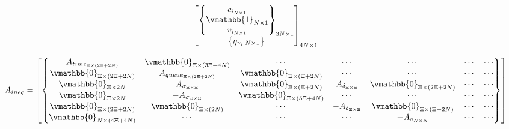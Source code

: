 \documentclass[letterpaper, 10pt, conference]{IEEEtran}
\begin{document}
\begin{equation}
\begin{array}{c}
\begin{bmatrix}
\begin{Bmatrix}
        c_{i_{N \times 1}} \\
        \vmathbb{1}_{N \times 1} \\
        v_{i_{N \times 1}} \\
    \end{Bmatrix}_{3N \times 1} \\
    \begin{Bmatrix}
        \eta_{\gamma_{i}\; N \times 1} \\
    \end{Bmatrix}
\end{bmatrix}_{4N \times 1}
\end{array}
\end{equation}

\begin{equation}
\begin{array}{c}
    A_{ineq} =
    \begin{bmatrix}
        \begin{Bmatrix}
            A_{time_{\Xi \times (2\Xi + 2N)}}   & \vmathbb{0}_{\Xi \times (3\Xi + 4N)} & \cdots                              & \cdots                       & \cdots                            & \cdots              & \cdots \\
            \vmathbb{0}_{\Xi \times (2\Xi + 2N)} & A_{queue_{\Xi \times (2\Xi + 2N)}}  & \vmathbb{0}_{\Xi \times (\Xi + 2N)}  & \cdots                       & \cdots                            & \cdots              & \cdots \\
            \vmathbb{0}_{\Xi \times 2N}          & A_{\sigma_{\Xi \times \Xi}}         & \vmathbb{0}_{\Xi \times (\Xi + 2N)}  & A_{\delta_{\Xi \times \Xi}}  & \vmathbb{0}_{\Xi \times (2\Xi + 2N)} & \cdots              & \cdots \\
            \vmathbb{0}_{\Xi \times 2N}          & -A_{\sigma_{\Xi \times \Xi}}        & \vmathbb{0}_{\Xi \times (5\Xi + 4N)} & \cdots                       & \cdots                            & \cdots              & \cdots \\
            \vmathbb{0}_{\Xi \times (2\Xi + 2N)} & \vmathbb{0}_{\Xi \times (2N)}  & \cdots                              & -A_{\delta_{\Xi \times \Xi}} & \vmathbb{0}_{\Xi \times (\Xi + 2N)}        & \cdots              & \cdots \\
            \vmathbb{0}_{N \times (4\Xi + 4N)}   & \cdots                              & \cdots                              & \cdots                       & -A_{a_{N \times N}}               & \cdots              & \cdots \\

\end{Bmatrix}
\end{bmatrix}
\end{array}
\end{equation}
\end{document}
